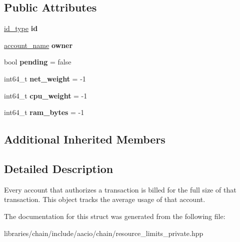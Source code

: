 \subsection*{Public Attributes}
\begin{DoxyCompactItemize}
\item 
\mbox{\label{structaacio_1_1chain_1_1resource__limits_1_1resource__limits__object_adb304054e7380b2f84b224d78f99d4ec}} 
\mbox{\hyperlink{classchainbase_1_1oid}{id\+\_\+type}} {\bfseries id}
\item 
\mbox{\label{structaacio_1_1chain_1_1resource__limits_1_1resource__limits__object_ab19da7f3aaa16af4753048c229d1b4df}} 
\mbox{\hyperlink{structaacio_1_1chain_1_1name}{account\+\_\+name}} {\bfseries owner}
\item 
\mbox{\label{structaacio_1_1chain_1_1resource__limits_1_1resource__limits__object_a70e644dfb0a0d0672898eb7bd0fcd06e}} 
bool {\bfseries pending} = false
\item 
\mbox{\label{structaacio_1_1chain_1_1resource__limits_1_1resource__limits__object_a0410be7ae808060c78223978452c2beb}} 
int64\+\_\+t {\bfseries net\+\_\+weight} = -\/1
\item 
\mbox{\label{structaacio_1_1chain_1_1resource__limits_1_1resource__limits__object_a9c1bac5b427693d321eadc25948c7bb6}} 
int64\+\_\+t {\bfseries cpu\+\_\+weight} = -\/1
\item 
\mbox{\label{structaacio_1_1chain_1_1resource__limits_1_1resource__limits__object_a42abf14a15c72700f2900debf46e848f}} 
int64\+\_\+t {\bfseries ram\+\_\+bytes} = -\/1
\end{DoxyCompactItemize}
\subsection*{Additional Inherited Members}


\subsection{Detailed Description}
Every account that authorizes a transaction is billed for the full size of that transaction. This object tracks the average usage of that account. 

The documentation for this struct was generated from the following file\+:\begin{DoxyCompactItemize}
\item 
libraries/chain/include/aacio/chain/resource\+\_\+limits\+\_\+private.\+hpp\end{DoxyCompactItemize}
